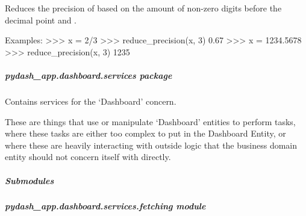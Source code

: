 \documentclass[letterpaper,10pt,english]{sphinxmanual}
\begin{document}

\begin{fulllineitems}
\label{\detokenize{pydash_app.dashboard.aggregator.statistics:pydash_app.dashboard.aggregator.statistics.reduce_precision}}
Reduces the precision of  based on the amount of non-zero digits before the decimal point
and .

Examples:
\textgreater{}\textgreater{}\textgreater{} x = 2/3
\textgreater{}\textgreater{}\textgreater{} reduce\_precision(x, 3)
0.67
\textgreater{}\textgreater{}\textgreater{} x = 1234.5678
\textgreater{}\textgreater{}\textgreater{} reduce\_precision(x, 3)
1235

\end{fulllineitems}



\subparagraph{pydash\_app.dashboard.services package}
\label{\detokenize{pydash_app.dashboard.services:module-pydash_app.dashboard.services}}\label{\detokenize{pydash_app.dashboard.services:pydash-app-dashboard-services-package}}\label{\detokenize{pydash_app.dashboard.services::doc}}
Contains services for the ‘Dashboard’ concern.

These are things that use or manipulate ‘Dashboard’ entities to perform tasks,
where these tasks are either too complex to put in the Dashboard Entity,
or where these are heavily interacting with outside logic that the business domain entity should not concern itself with directly.

\begin{fulllineitems}
\label{\detokenize{pydash_app.dashboard.services:pydash_app.dashboard.services.is_valid_dashboard}}
\end{fulllineitems}



\subparagraph{Submodules}
\label{\detokenize{pydash_app.dashboard.services:submodules}}

\subparagraph{pydash\_app.dashboard.services.fetching module}
\label{\detokenize{pydash_app.dashboard.services.fetching:module-pydash_app.dashboard.services.fetching}}\label{\detokenize{pydash_app.dashboard.services.fetching:pydash-app-dashboard-services-fetching-module}}\label{\detokenize{pydash_app.dashboard.services.fetching::doc}}
\end{document}
